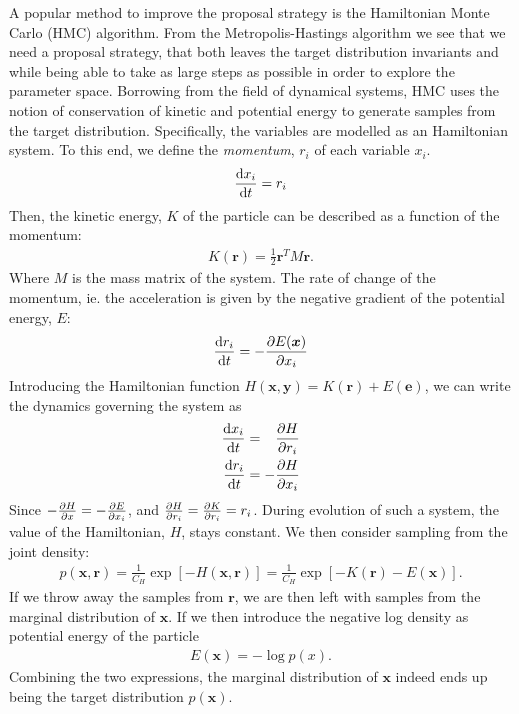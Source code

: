 A popular method to improve the proposal strategy is the Hamiltonian Monte Carlo (HMC) algorithm. 
From the Metropolis-Hastings algorithm we see that we need a proposal strategy, that both leaves the target distribution invariants and while being able to take as large steps as possible in order to explore the parameter space.
Borrowing from the field of dynamical systems, HMC uses the notion of conservation of kinetic and potential energy to generate samples from the target distribution. Specifically, the variables are modelled as an Hamiltonian system. To this end, we define the \emph{momentum}, $r_i$ of each variable $x_i$.
\begin{align*}
    \dv{x_i}{t} = r_i
\end{align*}
Then, the kinetic energy, $K$ of the particle can be described as a function of the momentum:
\begin{align*}
    K(\bm{r}) = \frac{1}{2}\bm{r}^T M \bm{r}.
\end{align*}
Where $M$ is the mass matrix of the system. The rate of change of the momentum, ie. the acceleration is given by the negative gradient of the potential energy, $E$:
\begin{align*}
    \dv{r_i}{t} = -\pdv{E(\bm{x})}{x_i}
\end{align*}
Introducing the Hamiltonian function $H(\bm{x}, \bm{y}) = K(\bm{r}) + E(\bm{e})$, we can write the dynamics governing the system as
\begin{align*}
    \dv{x_i}{t} &= \phantom{-}\pdv{H}{r_i}\\
    \dv{r_i}{t} &= -\pdv{H}{x_i}
\end{align*}
Since $-\pdv{H}{x} = -\pdv{E}{x_i}$, and $\pdv{H}{r_i} = \pdv{K}{r_i} = r_i$. During evolution of such a system, the value of the Hamiltonian, $H$, stays constant. We then consider sampling from the joint density:
\begin{align*}
    p(\bm{x}, \bm{r}) = \frac{1}{C_H} \exp\left[ -H(\bm{x}, \bm{r})\right] = \frac{1}{C_H} \exp\left[-K(\bm{r}) - E(\bm{x})  \right].
\end{align*}
If we throw away the samples from $\bm{r}$, we are then left with samples from the marginal distribution of $\bm{x}$. If we then introduce the negative log density as potential energy of the particle
\begin{align*}
    E(\bm{x}) = -\log{p(x)}.
\end{align*}
Combining the two expressions, the marginal distribution of $\bm{x}$ indeed ends up being the target distribution $p(\bm{x})$.

